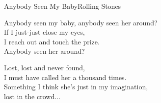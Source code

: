 \begin{song}{Anybody Seen My Baby}{Rolling Stones}
\begin{guitar}
Anybody seen my baby, anybody seen her around?\\
If I just-just close my eyes, \\
I reach out and touch the prize.\\
Anybody seen her around?\\
\end{guitar}



\begin{guitar}
Lost, lost and never found, \\
I must have called her a thousand times.\\
Something I think she's just in my imagination, \\
lost in the crowd...\\
\end{guitar}
\end{song}
